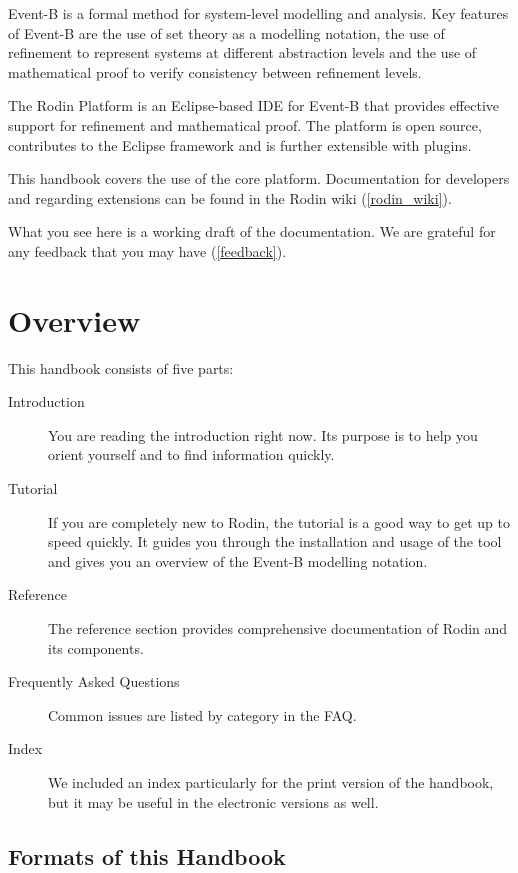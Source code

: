 \documentclass[12pt]{book}
\begin{document}
Event-B is a formal method for system-level modelling and analysis. Key features of Event-B are the use of set theory as a modelling notation, the use of refinement to represent systems at different abstraction levels and the use of mathematical proof to verify consistency between refinement levels.

The Rodin Platform is an Eclipse-based IDE for Event-B that provides effective support for refinement and mathematical proof. The platform is open source, contributes to the Eclipse framework and is further extensible with plugins. 

This handbook covers the use of the core platform.  Documentation for developers and regarding extensions can be found in the Rodin wiki (\ref{rodin_wiki}).

What you see here is a working draft of the documentation.  We are grateful for any feedback that you may have (\ref{feedback}).

\section{Overview}

This handbook consists of five parts:

\begin{description}
	\item[Introduction] You are reading the introduction right now.  Its purpose is to help you orient yourself and to find information quickly.
	\item[Tutorial] If you are completely new to Rodin, the tutorial is a good way to get up to speed quickly.  It guides you through the installation and usage of the tool and gives you an overview of the Event-B modelling notation.
	\item[Reference] The reference section provides comprehensive documentation of Rodin and its components.
	\item[Frequently Asked Questions] Common issues are listed by category in the FAQ.
	\item[Index] We included an index particularly for the print version of the handbook, but it may be useful in the electronic versions as well.  
\end{description}

\subsection{Formats of this Handbook}
\label{handbook_formats}
\end{document}
